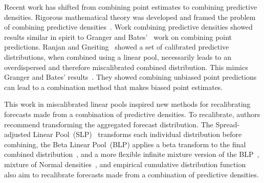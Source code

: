 \documentclass[preprint,authoryear]{elsarticle}
\begin{document}
Recent work has shifted from combining point estimates to combining predictive densities.
Rigorous mathematical theory was developed and framed the problem of combining predictive densities~\citep{gneiting2013combining}.
Work combining predictive densities showed results similar in spirit to Granger and Bates'~\citep{bates1969combination,granger1984improved} work on combining point predictions.
Ranjan and Gneiting~\citep{ranjan2010combining,gneiting2013combining} showed a set of calibrated predictive distributions, when combined using a linear pool, necessarily leads to an overdispersed and therefore miscalibrated combined distribution.
This mimics Granger and Bates' results~\citep{bates1969combination}. 
They showed combining unbiased point predictions can lead to a combination method that makes biased point estimates.

This work in miscalibrated linear pools inspired new methods for recalibrating forecasts made from a combination of predictive densities. To recalibrate, authors recommend transforming the aggregated forecast distribution.
The Spread-adjusted Linear Pool~(SLP)~\citep{berrocal2007combining,glahn2009mos,kleiber2011locally} transforms each individual distribution before combining, the Beta Linear Pool~(BLP) applies a beta transform to the final combined  distribution~\cite{gneiting2013combining,ranjan2010combining}, and a more flexible infinite mixture version of the BLP~\cite{bassetti2018bayesian}, mixture of Normal densities~\cite{baran2018combining}, and empirical cumulative distribution function~\cite{garratt2019empirically} also aim to recalibrate forecasts made from a combination of predictive densities.
\end{document}
